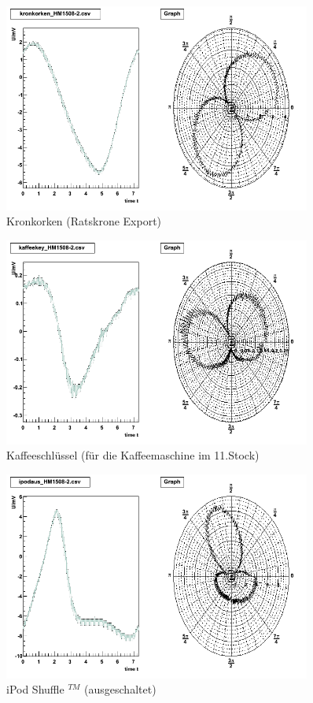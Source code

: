 \begin{appendix}
\begin{figure}[H]
	\centering \includegraphics[width=0.9\textwidth]{Auswertung/Proben-polar/kronkorken.png}
	\caption{Kronkorken (Ratskrone Export)}
\end{figure}

\begin{figure}[H]
	\centering \includegraphics[width=0.9\textwidth]{Auswertung/Proben-polar/kaffeekey.png}
	\caption{Kaffeeschlüssel (für die Kaffeemaschine im 11.Stock)}
\end{figure}

\begin{figure}[H]
	\centering \includegraphics[width=0.9\textwidth]{Auswertung/Proben-polar/ipodaus.png}
	\caption{iPod Shuffle $^{TM}$ (ausgeschaltet)}
\end{figure}


\end{appendix}

